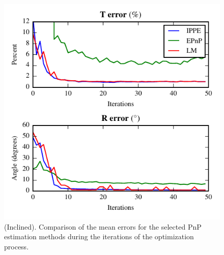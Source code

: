 \documentclass[letterpaper, 10 pt, conference]{ieeeconf}  %
\begin{document}
	\begin{figure}[t]
		\begin{center}
			\includegraphics[width=\columnwidth]{img/pose_together_inclined.pdf}
			\caption{\label{fig:IN_pnp_results_global}\small  (Inclined). Comparison of the mean errors for the selected PnP estimation methods during the iterations of the optimization process.}
		\end{center}
		\vspace{-0.5cm}
	\end{figure}
	
\end{document}
